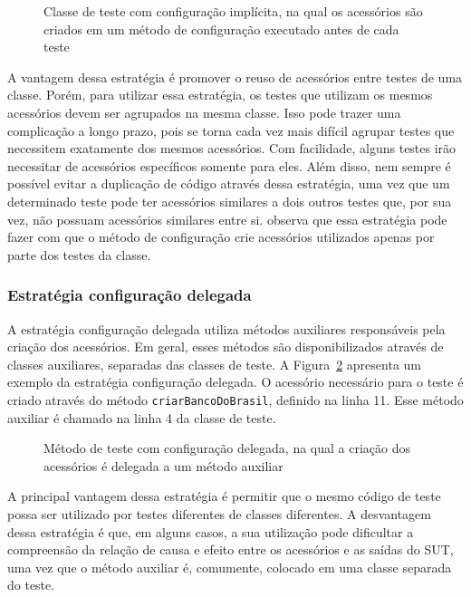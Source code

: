 \begin{figure}[htb]
	\centering
	
	\caption{Classe de teste com configuração implícita, na qual os acessórios são criados em um método de configuração executado antes de cada teste}
	\label{code:7-implicit-setup-test}
\end{figure}

A vantagem dessa estratégia é promover o reuso de acessórios entre testes de uma classe. Porém, para utilizar essa estratégia, os testes que utilizam os mesmos acessórios devem ser agrupados na mesma classe. Isso pode trazer uma complicação a longo prazo, pois se torna cada vez mais difícil agrupar testes que necessitem exatamente dos mesmos acessórios. Com facilidade, alguns testes irão necessitar de acessórios específicos somente para eles. Além disso, nem sempre é possível evitar a duplicação de código através dessa estratégia, uma vez que um determinado teste pode ter acessórios similares a dois outros testes que, por sua vez, não possuam acessórios similares entre si.  observa que essa estratégia pode fazer com que o método de configuração crie acessórios utilizados apenas por parte dos testes da classe.

\subsubsection{Estratégia configuração delegada}

A estratégia configuração delegada utiliza métodos auxiliares responsáveis pela criação dos acessórios. Em geral, esses métodos são disponibilizados através de classes auxiliares, separadas das classes de teste. A Figura~\ref{code:8-delegated-setup-test} apresenta um exemplo da estratégia configuração delegada. O acessório necessário para o teste é criado através do método \texttt{criarBancoDoBrasil}, definido na linha 11. Esse método auxiliar é chamado na linha 4 da classe de teste.

\begin{figure}[htb]
	\centering
	
	\caption{Método de teste com configuração delegada, na qual a criação dos acessórios é delegada a um método auxiliar}
	\label{code:8-delegated-setup-test}
\end{figure}

A principal vantagem dessa estratégia é permitir que o mesmo código de teste possa ser utilizado por testes diferentes de classes diferentes. A desvantagem dessa estratégia é que, em alguns casos, a sua utilização pode dificultar a compreensão da relação de causa e efeito entre os acessórios e as saídas do SUT, uma vez que o método auxiliar é, comumente, colocado em uma classe separada do teste.

